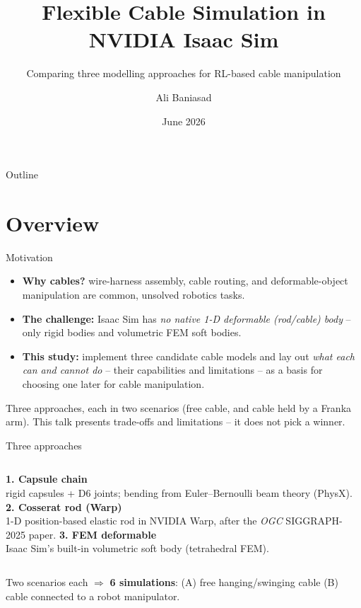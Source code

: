 \documentclass[aspectratio=169]{beamer}
\title[Cable Simulation in Isaac Sim]{Flexible Cable Simulation in NVIDIA Isaac Sim}
\subtitle{Comparing three modelling approaches for RL-based cable manipulation}
\author[A. Baniasad]{Ali Baniasad}
\institute[U. Waterloo]{Supervisor: Prof.\ Soo Jeon \\ University of Waterloo}
\date{June 2026}
\begin{document}
\section{}
\begin{frame}
  \titlepage
\end{frame}

\begin{frame}{Outline}\tableofcontents\end{frame}

\section{Overview}

\begin{frame}{Motivation}
  \begin{itemize}
    \item \textbf{Why cables?} wire-harness assembly, cable routing, and
          deformable-object manipulation are common, unsolved robotics tasks.
    \item \textbf{The challenge:} Isaac Sim has \emph{no native 1-D deformable
          (rod/cable) body} -- only rigid bodies and volumetric FEM soft bodies.
    \item \textbf{This study:} implement three candidate cable models and lay out
          \emph{what each can and cannot do} -- their capabilities and limitations --
          as a basis for choosing one later for cable manipulation.
  \end{itemize}
  \vfill
  {\footnotesize Three approaches, each in two scenarios (free cable, and cable held
   by a Franka arm). This talk presents trade-offs and limitations -- it does not pick a winner.}
\end{frame}

\begin{frame}{Three approaches}
  \begin{columns}[t]
    \centering
      \textbf{1. Capsule chain}\\\smallskip
      {\footnotesize rigid capsules + D6 joints; bending from Euler--Bernoulli
       beam theory (PhysX).}
    \centering
      \textbf{2. Cosserat rod (Warp)}\\\smallskip
      {\footnotesize 1-D position-based elastic rod in NVIDIA Warp, after the
       \emph{OGC} SIGGRAPH-2025 paper.}
    \centering
      \textbf{3. FEM deformable}\\\smallskip
      {\footnotesize Isaac Sim's built-in volumetric soft body (tetrahedral FEM).}
  \end{columns}
  \vfill
  \begin{center}\footnotesize
  Two scenarios each $\Rightarrow$ \textbf{6 simulations}:
  (A) free hanging/swinging cable \quad (B) cable connected to a robot manipulator.
  \end{center}
\end{frame}
\end{document}

